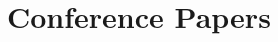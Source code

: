 \section*{Conference Papers}

\begin{refsection}
    \nocite{*}
    \printbibliography[heading=none]
\end{refsection}